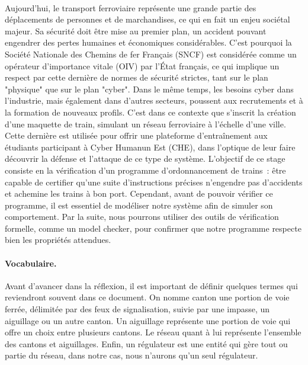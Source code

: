 \documentclass[oneside, a4paper, 11pt]{book}
\begin{document}
\paragraph{}
Aujourd'hui, le transport ferroviaire représente une grande partie des déplacements de personnes et de marchandises, ce qui en fait un enjeu sociétal majeur.
Sa sécurité doit être mise au premier plan, un accident pouvant engendrer des pertes humaines et économiques considérables. C'est pourquoi la Société Nationale des Chemins de fer Français (SNCF) est considérée comme un opérateur d'importance vitale (OIV) par l'État français, ce qui implique un respect par cette dernière de normes de sécurité strictes, tant sur le plan "physique" que sur le plan "cyber". 
Dans le même temps, les besoins cyber dans l'industrie, mais également dans d'autres secteurs, poussent aux recrutements et à la formation de nouveaux profils.
C'est dans ce contexte que s'inscrit la création d'une maquette de train, simulant un réseau ferroviaire à l'échelle d'une ville. Cette dernière est utilisée pour offrir une plateforme d'entraînement aux étudiants participant à Cyber Humanun Est (CHE), dans l'optique de leur faire découvrir la défense et l'attaque de ce type de système.
L'objectif de ce stage consiste en la vérification d'un programme d'ordonnancement de trains~: être capable de certifier qu'une suite d'instructions précises n'engendre pas d'accidents et achemine les trains à bon port.
Cependant, avant de pouvoir vérifier ce programme, il est essentiel de modéliser notre système afin de simuler son comportement. Par la suite, nous pourrons utiliser des outils de vérification formelle, comme un model checker, pour confirmer que notre programme respecte bien les propriétés attendues.

\paragraph{Vocabulaire.}
Avant d'avancer dans la réflexion, il est important de définir quelques termes qui reviendront souvent dans ce document. On nomme canton une portion de voie ferrée, délimitée par des feux de signalisation, suivie par une impasse, un aiguillage ou un autre canton. 
Un aiguillage représente une portion de voie qui offre un choix entre plusieurs cantons. Le réseau quant à lui représente l'ensemble des cantons et aiguillages. Enfin, un régulateur est une entité qui gère tout ou partie du réseau, dans notre cas, nous n'aurons qu'un seul régulateur. 
\end{document}
